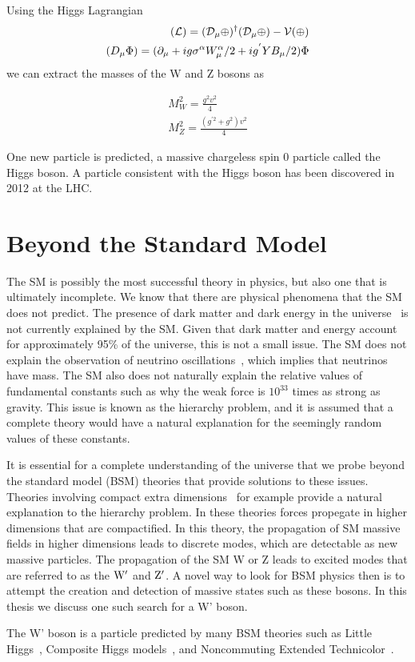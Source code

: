 Using the Higgs Lagrangian
\begin{eqnarray}
\mathrm{\cal(L) = (D_{\mu} \Phi )^{\dagger}(D_{\mu} \Phi ) -V( \Phi )}\\
(D_{\mu}\Phi) = (\partial_{\mu}+i g \sigma^{\alpha} W_{\mu}^{\alpha}/2 +i g^{'} Y B_{\mu}/2)\Phi
\end{eqnarray}  
we can extract the masses of the W and Z bosons as

\begin{eqnarray}
M_{W}^2 = \frac{g^{2}v^{2}}{4}\\
M_{Z}^2 = \frac{(g^{'2}+g^{2})v^{2}}{4}
\end{eqnarray}  

One new particle is predicted, a massive chargeless spin 0 particle called the Higgs boson.  
A particle consistent with the Higgs boson has been discovered in 2012 at the LHC.  

  
\section{Beyond the Standard Model}
The SM is possibly the most successful theory in physics, but also one that is ultimately incomplete.  
We know that there are physical phenomena that the SM does not predict.  
The presence of dark matter and dark energy in the universe~\cite{Bennett:2003ba} is not currently explained by the SM.  
Given that dark matter and energy account for approximately 95\% of the universe, this is not a small issue.  
The SM does not explain the observation of neutrino oscillations~\cite{An:2012eh}, which implies that neutrinos have mass.  
The SM also does not naturally explain the relative values of fundamental constants such as why the weak force is $10^{33}$ times as strong as gravity.  
This issue is known as the hierarchy problem, and it is assumed that a complete theory would have a natural explanation for the seemingly random values of these constants.  

It is essential for a complete understanding of the universe that we probe beyond the standard model (BSM) theories that provide solutions to these issues.  
Theories involving compact extra dimensions~\cite{PhysRevD.64.035002} for example provide a natural explanation to the hierarchy problem.  
In these theories forces propegate in higher dimensions that are compactified.   
In this theory, the propagation of SM massive fields in higher dimensions leads to discrete modes, which are detectable as new massive particles.  
The propagation of the SM W or Z leads to excited modes that are referred to as the $\mathrm{W}^\prime$ and $\mathrm{Z}^\prime$.
A novel way to look for BSM physics then is to attempt the creation and detection of massive states such as these bosons. 
In this thesis we discuss one such search for a W' boson.  

The W' boson is a particle predicted by many BSM theories such as Little Higgs~\cite{doi:10.1146/annurev.nucl.55.090704.151502}, 
Composite Higgs models~\cite{Vecchi:2013bja}, and Noncommuting Extended Technicolor~\cite{Chivukula:1995gu}.  



